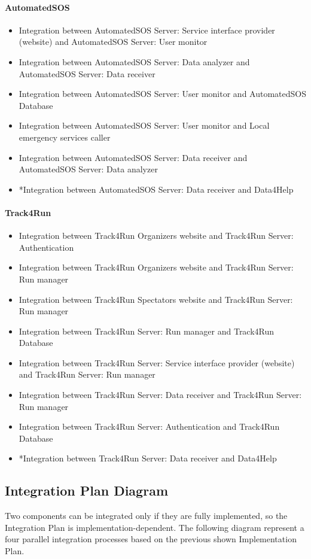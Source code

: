 \documentclass[../DD.tex]{subfiles}
\begin{document}
		\paragraph{AutomatedSOS}
		\begin{itemize}
			\item{Integration between AutomatedSOS Server: Service interface provider (website) and AutomatedSOS Server: User monitor}
			\item{Integration between AutomatedSOS Server: Data analyzer and AutomatedSOS Server: Data receiver}
			\item{Integration between AutomatedSOS Server: User monitor and AutomatedSOS Database}
			\item{Integration between AutomatedSOS Server: User monitor and Local emergency services caller}
			\item{Integration between AutomatedSOS Server: Data receiver and AutomatedSOS Server: Data analyzer}
			\item{*Integration between AutomatedSOS Server: Data receiver and Data4Help}
		\end{itemize}

		\paragraph{Track4Run}
		\begin{itemize}
			\item{Integration between Track4Run Organizers website and Track4Run Server: Authentication}
			\item{Integration between Track4Run Organizers website and Track4Run Server: Run manager}
			\item{Integration between Track4Run Spectators website and Track4Run Server: Run manager}
			\item{Integration between Track4Run Server: Run manager and Track4Run Database}
			\item{Integration between Track4Run Server: Service interface provider (website) and Track4Run Server: Run manager}
			\item{Integration between Track4Run Server: Data receiver and Track4Run Server: Run manager}
			\item{Integration between Track4Run Server: Authentication and Track4Run Database}
			\item{*Integration between Track4Run Server: Data receiver and Data4Help}
		\end{itemize}
	
	\subsection{Integration Plan Diagram}
	Two components can be integrated only if they are fully implemented, so the Integration Plan is implementation-dependent. The following diagram represent a four parallel integration processes based on the previous shown Implementation Plan.
\end{document}

